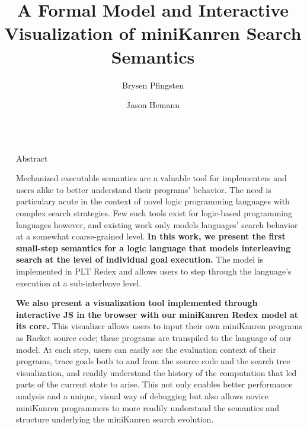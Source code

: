 \documentclass[final]{beamer}
\title{A Formal Model and Interactive Visualization of miniKanren Search Semantics}
\author{Brysen Pfingsten \and Jason Hemann}
\newlength{\sepwidth}
\newlength{\colwidth}
\newcommand{\separatorcolumn}{\begin{column}{\sepwidth}\end{column}}
\begin{document}


\begin{frame}[t]
\begin{columns}[t]
\separatorcolumn


\begin{column}{\colwidth}


  \begin{block}{Abstract}

Mechanized executable semantics are a valuable tool for implementers and users alike to better understand their programs' behavior. 
The need is particulary acute in the context of novel logic programming languages with complex search strategies. 
Few such tools exist for logic-based programming languages however, and existing work only models languages' search behavior at a somewhat coarse-grained level.
\textbf{In this work, we present the first small-step semantics for a logic language that models interleaving search at the level of individual goal execution.}
 The model is implemented in PLT Redex and allows users to step through the language's execution at a sub-interleave level.

\textbf{We also present a visualization tool implemented through interactive JS in the browser with our miniKanren Redex model at its core.}
This visualizer allows users to input their own miniKanren programs as Racket source code; these programs are transpiled to the language of our model. 
At each step, users can easily see the evaluation context of their programs, trace goals both to and from the source code and the search tree visualization, and readily understand the history of the computation that led parts of the current state to arise. 
This not only enables better performance analysis and a unique, visual way of debugging but also allows novice miniKanren programmers to more readily understand the semantics and structure underlying the miniKanren search evolution.

  \end{block}
  
  

\end{column}
\end{columns}
\end{frame}
\end{document}
